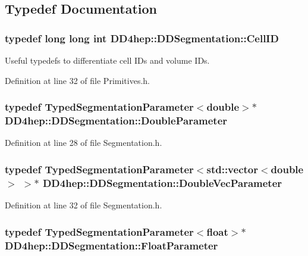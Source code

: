 \subsection{Typedef Documentation}
\hypertarget{namespace_d_d4hep_1_1_d_d_segmentation_ac7af071d85cb48820914434a07e21ba1}{
\subsubsection[{CellID}]{\setlength{\rightskip}{0pt plus 5cm}typedef long long int {\bf DD4hep::DDSegmentation::CellID}}}
\label{namespace_d_d4hep_1_1_d_d_segmentation_ac7af071d85cb48820914434a07e21ba1}


Useful typedefs to differentiate cell IDs and volume IDs. 

Definition at line 32 of file Primitives.h.\hypertarget{namespace_d_d4hep_1_1_d_d_segmentation_a58fbf7ecc413a4ffb59ab7b49d1af947}{
\subsubsection[{DoubleParameter}]{\setlength{\rightskip}{0pt plus 5cm}typedef {\bf TypedSegmentationParameter}$<$double$>$$\ast$ {\bf DD4hep::DDSegmentation::DoubleParameter}}}
\label{namespace_d_d4hep_1_1_d_d_segmentation_a58fbf7ecc413a4ffb59ab7b49d1af947}


Definition at line 28 of file Segmentation.h.\hypertarget{namespace_d_d4hep_1_1_d_d_segmentation_ae7964d33264473a9df6cfb5194cfb740}{
\subsubsection[{DoubleVecParameter}]{\setlength{\rightskip}{0pt plus 5cm}typedef {\bf TypedSegmentationParameter}$<$std::vector$<$double$>$ $>$$\ast$ {\bf DD4hep::DDSegmentation::DoubleVecParameter}}}
\label{namespace_d_d4hep_1_1_d_d_segmentation_ae7964d33264473a9df6cfb5194cfb740}


Definition at line 32 of file Segmentation.h.\hypertarget{namespace_d_d4hep_1_1_d_d_segmentation_a1f6134fdcd18b625bc940d064598090a}{
\subsubsection[{FloatParameter}]{\setlength{\rightskip}{0pt plus 5cm}typedef {\bf TypedSegmentationParameter}$<$float$>$$\ast$ {\bf DD4hep::DDSegmentation::FloatParameter}}}
\label{namespace_d_d4hep_1_1_d_d_segmentation_a1f6134fdcd18b625bc940d064598090a}


